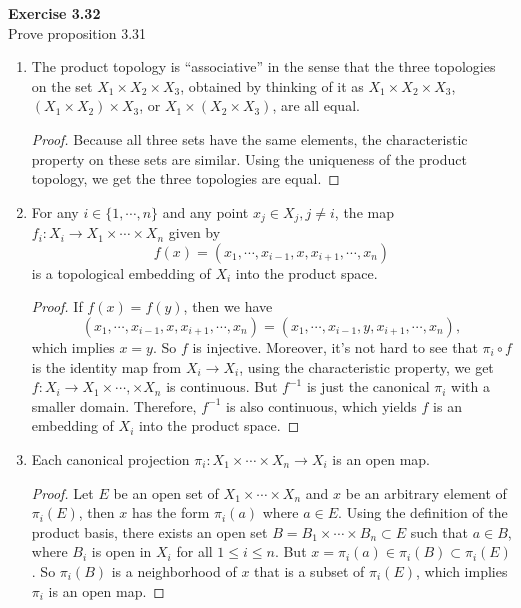 \documentclass[12pt, a4paper]{article}
\theoremstyle{plain}
\newenvironment{exercise}[2][Exercise]
    { \begin{mdframed}[backgroundcolor=gray!20] \textbf{#1 #2} \\}
    {  \end{mdframed}}
\begin{document}
\begin{exercise}{3.32}
Prove proposition 3.31
\begin{enumerate}[label=(\alph*)]
\item The product topology is “associative” in the sense that the three topologies on the set $X_1\times X_2\times X_3$, obtained by thinking of it as $X_1\times X_2\times X_3$, $(X_1\times X_2)\times X_3$, or $X_1\times (X_2\times X_3)$, are all equal.
	\begin{proof}
	Because all three sets have the same elements, the characteristic property on these sets are similar. Using the uniqueness of the product topology, we get the three topologies are equal.
	\end{proof}

\item For any $i\in\{1,\cdots,n\}$ and any point $x_j\in X_j, j\neq i$, the map $f_i:X_i\rightarrow X_1\times\cdots\times X_n$ given by
\[
f(x)=(x_1,\cdots,x_{i-1},x,x_{i+1},\cdots,x_n)
\]
is a topological embedding of $X_i$ into the product space.
	\begin{proof}
	If $f(x)=f(y)$, then we have 
	\[(x_1,\cdots,x_{i-1},x,x_{i+1},\cdots,x_n)=(x_1,\cdots,x_{i-1},y,x_{i+1},\cdots,x_n),
	\]
	which implies $x=y$. So $f$ is injective. Moreover, it's not hard to see that $\pi_i\circ f$ is the identity map from $X_i\rightarrow X_i$, using the characteristic property, we get $f:X_i\rightarrow X_1\times\cdots,\times X_n$ is continuous. But $f^{-1}$ is just the canonical $\pi_i$ with a smaller domain. Therefore, $f^{-1}$ is also continuous, which yields $f$ is an embedding of $X_i$ into the product space.
	\end{proof}

\item Each canonical projection $\pi_i:X_1\times\cdots\times X_n\rightarrow X_i$ is an open map.
	\begin{proof}
	Let $E$ be an open set of $X_1\times\cdots\times X_n$ and $x$ be an arbitrary element of $\pi_i(E)$, then $x$ has the form $\pi_i(a)$ where $a\in E$. Using the definition of the product basis, there exists an open set $B=B_1\times\cdots\times B_n\subset E$ such that $a\in B$, where $B_i$ is open in $X_i$ for all $1\leq i\leq n$. But $x=\pi_i(a)\in\pi_i(B)\subset \pi_i(E)$. So $\pi_i(B)$ is a neighborhood of $x$ that is a subset of $\pi_i(E)$, which implies $\pi_i$ is an open map.
	\end{proof}
	
\pagebreak


\end{enumerate}
\end{exercise}
\end{document}
